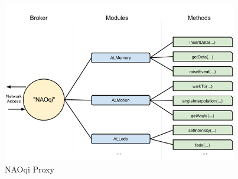 \begin{figure}
	[h] \centering 
	\includegraphics[height=7cm]{figures/content/nao-proxy.png} \caption{NAOqi Proxy} \label{fg:nao:proxy} 
\end{figure}
